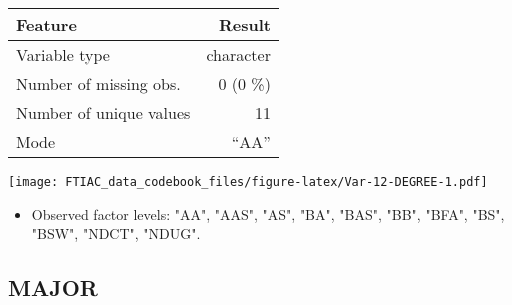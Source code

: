 \documentclass[]{article}
\providecommand{\tightlist}{%
  \setlength{\itemsep}{0pt}\setlength{\parskip}{0pt}}
\newcommand{\fullline}{\noindent\makebox[\linewidth]{\rule{\textwidth}{0.4pt}}}
\newcommand{\bminione}{\begin{minipage}{0.75 \textwidth}}
\newcommand{\bminitwo}{\begin{minipage}{0.25 \textwidth}}
\newcommand{\emini}{\end{minipage}}
\begin{document}
\bminione

\begin{longtable}[]{@{}lr@{}}
\toprule
\begin{minipage}[b]{0.34\columnwidth}\raggedright\strut
Feature\strut
\end{minipage} & \begin{minipage}[b]{0.14\columnwidth}\raggedleft\strut
Result\strut
\end{minipage}\tabularnewline
\midrule
\endhead
\begin{minipage}[t]{0.34\columnwidth}\raggedright\strut
Variable type\strut
\end{minipage} & \begin{minipage}[t]{0.14\columnwidth}\raggedleft\strut
character\strut
\end{minipage}\tabularnewline
\begin{minipage}[t]{0.34\columnwidth}\raggedright\strut
Number of missing obs.\strut
\end{minipage} & \begin{minipage}[t]{0.14\columnwidth}\raggedleft\strut
0 (0 \%)\strut
\end{minipage}\tabularnewline
\begin{minipage}[t]{0.34\columnwidth}\raggedright\strut
Number of unique values\strut
\end{minipage} & \begin{minipage}[t]{0.14\columnwidth}\raggedleft\strut
11\strut
\end{minipage}\tabularnewline
\begin{minipage}[t]{0.34\columnwidth}\raggedright\strut
Mode\strut
\end{minipage} & \begin{minipage}[t]{0.14\columnwidth}\raggedleft\strut
``AA''\strut
\end{minipage}\tabularnewline
\bottomrule
\end{longtable}

\emini
\bminitwo
\texttt{[image: FTIAC\_data\_codebook\_files/figure-latex/Var-12-DEGREE-1.pdf]}
\emini

\begin{itemize}
\tightlist
\item
  Observed factor levels: "AA", "AAS", "AS", "BA", "BAS", "BB", "BFA",
  "BS", "BSW", "NDCT", "NDUG".
\end{itemize}

\fullline

\hypertarget{major}{\subsection{MAJOR}\label{major}}
\end{document}
